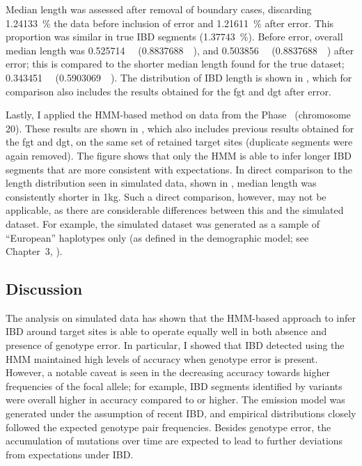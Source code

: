 %

%

Median length was assessed after removal of boundary cases, discarding \SI{1.24133}{\percent} the data before inclusion of error and \SI{1.21611}{\percent} after error.
This proportion was similar in true IBD segments (\SI{1.37743}{\percent}).
Before error, overall median length was \SI{0.525714}{\mega\basepair} (\SI{0.8837688}{\centi\morgan}), and \SI{0.503856}{\mega\basepair} (\SI{0.8837688}{\centi\morgan}) after error; this is compared to the shorter median length found for the true dataset; \SI{0.343451}{\mega\basepair} (\SI{0.5903069}{\centi\morgan}).
The distribution of IBD length is shown in , which for comparison also includes the results obtained for the \gls{fgt} and \gls{dgt} after error.

%

%


Lastly, I applied the HMM-based method on data from the  Phase~ (chromosome 20).
These results are shown in , which also includes previous results obtained for the \gls{fgt} and \gls{dgt}, on the same set of retained target sites (duplicate segments were again removed).
The figure shows that only the HMM is able to infer longer IBD segments that are more consistent with expectations.
In direct comparison to the length distribution seen in simulated data, shown in , median length was consistently shorter in \gls{1kg}.
Such a direct comparison, however, may not be applicable, as there are considerable differences between this and the simulated dataset.
For example, the simulated dataset was generated as a sample of ``European'' haplotypes only (as defined in the demographic model; see Chapter~3, ).


%

%


%
\subsection{Discussion}
%


%

%


The analysis on simulated data has shown that the HMM-based approach to infer IBD around target sites is able to operate equally well in both absence and presence of genotype error.
In particular, I showed that IBD detected using the HMM maintained high levels of accuracy when genotype error is present.
However, a notable caveat is seen in the decreasing accuracy towards higher frequencies of the focal allele; for example, IBD segments identified by  variants were overall higher in accuracy compared to  or higher.
The emission model was generated under the assumption of recent IBD, and empirical distributions closely followed the expected genotype pair frequencies.
Besides genotype error, the accumulation of mutations over time are expected to lead to further deviations from expectations under IBD.

